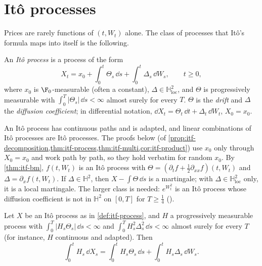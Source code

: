 
\section{It\^o processes}\label{sec:itf-processes}

Prices are rarely functions of $(t,W_t)$ alone. The class of processes that It\^o's formula maps
into itself is the following.

\begin{definition}[It\^o process]\label{def:itf-process}
An \emph{It\^o process} is a process of the form
\[
  X_t=x_0+\int_0^t\Theta_s\,\dd s+\int_0^t\Delta_s\,\dd W_s,\qquad t\ge0,
\]
where $x_0$ is $\F_0$-measurable (often a constant), $\Delta\in\mathbb H^2_{\mathrm{loc}}$, and
$\Theta$ is progressively measurable
with $\int_0^T|\Theta_s|\,\dd s<\infty$ almost surely for every $T$. $\Theta$ is the \emph{drift}
and $\Delta$ the \emph{diffusion coefficient}; in differential notation,
$\dd X_t=\Theta_t\,\dd t+\Delta_t\,\dd W_t$, $X_0=x_0$.
\end{definition}

An It\^o process has continuous paths and is adapted, and linear combinations of It\^o processes
are It\^o processes. The proofs below (of \cref{prop:itf-decomposition,thm:itf-process,thm:itf-multi,cor:itf-product})
use $x_0$ only through $X_0=x_0$ and work path by path, so they hold verbatim for random $x_0$. By \cref{thm:itf-bm}, $f(t,W_t)$ is an It\^o process with
$\Theta=(\partial_tf+\frac12\partial_{xx}f)(t,W_t)$ and $\Delta=\partial_xf(t,W_t)$. If
$\Delta\in\mathbb H^2$, then $X-\int\Theta\,\dd s$ is a martingale; with
$\Delta\in\mathbb H^2_{\mathrm{loc}}$ only, it is a local martingale. The larger class is needed:
$e^{W_t^2}$ is an It\^o process whose diffusion coefficient is not in $\mathbb H^2$ on $[0,T]$ for
$T\ge\frac14$ ().

\begin{definition}\label{def:itf-integral}
Let $X$ be an It\^o process as in \cref{def:itf-process}, and $H$ a progressively measurable
process with $\int_0^T|H_s\Theta_s|\,\dd s<\infty$ and $\int_0^TH_s^2\Delta_s^2\,\dd s<\infty$
almost surely for every $T$ (for instance, $H$ continuous and adapted). Then
\[
  \int_0^tH_s\,\dd X_s=\int_0^tH_s\Theta_s\,\dd s+\int_0^tH_s\Delta_s\,\dd W_s .
\]
\end{definition}

